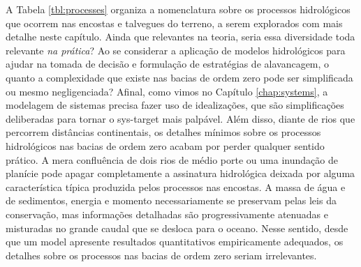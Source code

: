 \documentclass[./main.tex]{subfiles}
\begin{document}
\par A Tabela \ref{tbl:processes} organiza a nomenclatura sobre os processos hidrológicos que ocorrem nas encostas e talvegues do terreno, a serem explorados com mais detalhe neste capítulo. Ainda que relevantes na \gls{teoria}, seria essa diversidade toda relevante \textit{na prática}? Ao se considerar a aplicação de modelos hidrológicos para ajudar na tomada de decisão e formulação de estratégias de alavancagem, o quanto a complexidade que existe nas bacias de ordem zero pode ser simplificada ou mesmo negligenciada? Afinal, como vimos no Capítulo \ref{chap:systems}, a modelagem de sistemas precisa fazer uso de idealizações, que são simplificações deliberadas para tornar o \gls{sys-target} mais palpável. Além disso, diante de rios que percorrem distâncias continentais, os detalhes mínimos sobre os processos hidrológicos nas bacias de ordem zero acabam por perder qualquer sentido prático. A mera confluência de dois rios de médio porte ou uma inundação de planície pode apagar completamente a assinatura hidrológica deixada por alguma característica típica produzida pelos processos nas encostas. A massa de água e de sedimentos, energia e momento necessariamente se preservam pelas leis da conservação, mas informações detalhadas são progressivamente atenuadas e misturadas no grande caudal que se desloca para o oceano. Nesse sentido, desde que um \gls{model} apresente resultados quantitativos empiricamente adequados, os detalhes sobre os processos nas bacias de ordem zero seriam irrelevantes.
\end{document}
